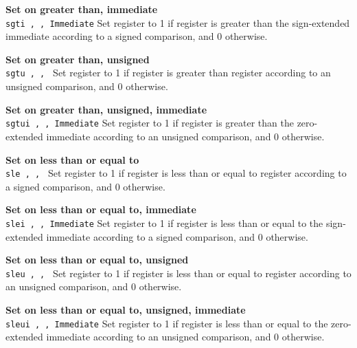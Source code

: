 \noindent
{\bf Set on greater than, immediate}\\
\noindent
\texttt{sgti \regd, \regs, Immediate}
Set register \regd{} to 1 if register \regs{} is
greater than the sign-extended immediate according to a signed comparison, and 0 otherwise.
\vspace{3ex}

\noindent
{\bf Set on greater than, unsigned}\\
\noindent
\texttt{sgtu \regd, \regs, \regt}
Set register \regd{} to 1 if register \regs{} is
greater than register \regt{} according to an unsigned comparison, and 0 otherwise.
\vspace{3ex}
\newpage

\noindent
{\bf Set on greater than, unsigned, immediate}\\
\noindent
\texttt{sgtui \regd, \regs, Immediate}
Set register \regd{} to 1 if register \regs{} is
greater than the zero-extended immediate according to an unsigned comparison, and 0 otherwise.
\vspace{3ex}

\noindent
{\bf Set on less than or equal to}\\
\noindent
\texttt{sle \regd, \regs, \regt}
Set register \regd{} to 1 if register \regs{} is
less than or equal to register \regt{} according to a signed comparison, and 0 otherwise.
\vspace{3ex}

\noindent
{\bf Set on less than or equal to, immediate}\\
\noindent
\texttt{slei \regd, \regs, Immediate}
Set register \regd{} to 1 if register \regs{} is
less than or equal to the sign-extended immediate according to a signed comparison, and 0 otherwise.
\vspace{3ex}

\noindent
{\bf Set on less than or equal to, unsigned}\\
\noindent
\texttt{sleu \regd, \regs, \regt}
Set register \regd{} to 1 if register \regs{} is
less than or equal to register \regt{} according to an unsigned comparison, and 0 otherwise.
\vspace{3ex}

\noindent
{\bf Set on less than or equal to, unsigned, immediate}\\
\noindent
\texttt{sleui \regd, \regs, Immediate}
Set register \regd{} to 1 if register \regs{} is
less than or equal to the zero-extended immediate according to an unsigned comparison, and 0 otherwise.
\vspace{3ex}
\newpage

